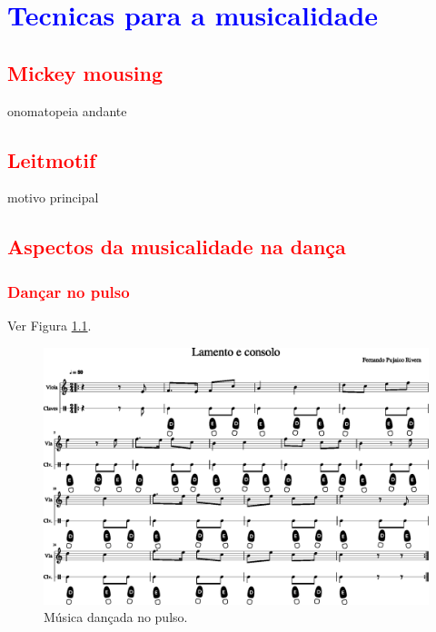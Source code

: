 
\chapter{\textcolor{blue}{Tecnicas para a musicalidade}}




\section{\textcolor{red}{Mickey mousing}}
onomatopeia andante


\section{\textcolor{red}{Leitmotif}}
motivo principal \cite[pp. 7]{bribitzer2015understanding} \cite[pp. 465]{apel1969harvard}


\section{\textcolor{red}{Aspectos da musicalidade na dança}}
\subsection{\textcolor{red}{Dançar no pulso}}
Ver Figura \ref{fig:lamentoconsolopulso1}.
\begin{figure}
    \centering
    \includegraphics[width=\textwidth]{chapters/cap-musicalidade-tecnica/lamento-e-consolo-clave-pulso-1.eps}
    \caption{Música dançada no pulso.}
    \label{fig:lamentoconsolopulso1}
\end{figure}


